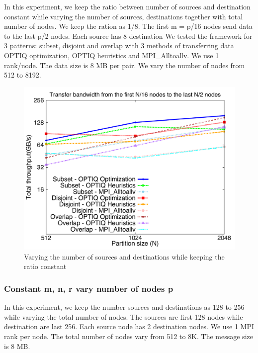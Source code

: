 In this experiment, we keep the ratio between number of sources and destination constant while varying the number of sources, destinations together with total number of nodes. We keep the ration as 1/8. The first m = p/16 nodes send data to the last p/2 nodes. Each source has 8 destination We tested the framework for 3 patterns: subset, disjoint and overlap with 3 methods of transferring data OPTIQ optimization, OPTIQ heuristics and MPI\_Alltoallv. We use 1 rank/node. The data size is 8 MB per pair. We vary the number of nodes from 512 to 8192.

\begin{figure}[!htb]
\vspace{-0.1in}
\centering
\includegraphics[scale=0.30]{figures/constantr.pdf}
\vspace{-0.1in}
\caption{Varying the number of sources and destinations while keeping the ratio constant}
\vspace{-0.1in}
\label{fig:aggbw}
\end{figure}

\subsubsection{Constant m, n, r vary number of nodes p}

In this experiment, we keep the number sources and destinations as 128 to 256 while varying the total number of nodes. The sources are first 128 nodes while destination are last 256. Each source node has 2 destination nodes. We use 1 MPI rank per node. The total number of nodes vary from 512 to 8K. The message size is 8 MB.

